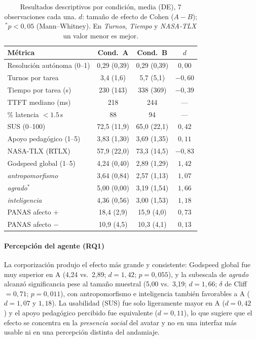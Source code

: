 \documentclass[conference]{IEEEtran}
\begin{document}
\begin{table}[t]
  \caption{Resultados descriptivos por condici\'on, media (DE), 7 observaciones cada una.
  $d$: tama\~no de efecto de Cohen ($A-B$); ${}^{*}p<0{,}05$ (Mann--Whitney). En \emph{Turnos},
  \emph{Tiempo} y \emph{NASA-TLX} un valor menor es mejor.}
  \label{tab:results}
  \centering
  \footnotesize
  \begin{tabular}{@{}lccc@{}}
    \toprule
    \textbf{M\'etrica} & \textbf{Cond.\ A} & \textbf{Cond.\ B} & \textbf{$d$} \\
    \midrule
    Resoluci\'on aut\'onoma (0--1) & 0{,}29 (0{,}39) & 0{,}29 (0{,}39) & $0{,}00$ \\
    Turnos por tarea & 3{,}4 (1{,}6) & 5{,}7 (5{,}1) & $-0{,}60$ \\
    Tiempo por tarea (s) & 230 (143) & 338 (369) & $-0{,}39$ \\
    TTFT mediano (ms) & 218 & 244 & --- \\
    \% latencia $<1.5$\,s & 88 & 94 & --- \\
    SUS (0--100) & 72{,}5 (11{,}9) & 65{,}0 (22{,}1) & $0{,}42$ \\
    Apoyo pedag\'ogico (1--5) & 3{,}83 (1{,}30) & 3{,}69 (1{,}35) & $0{,}11$ \\
    NASA-TLX (RTLX) & 57{,}9 (22{,}0) & 73{,}3 (14{,}5) & $-0{,}83$ \\
    Godspeed global (1--5) & 4{,}24 (0{,}40) & 2{,}89 (1{,}29) & $1{,}42$ \\
    \quad\emph{antropomorfismo} & 3{,}64 (0{,}84) & 2{,}57 (1{,}13) & $1{,}07$ \\
    \quad\emph{agrado}${}^{*}$ & 5{,}00 (0{,}00) & 3{,}19 (1{,}54) & $1{,}66$ \\
    \quad\emph{inteligencia} & 4{,}36 (0{,}56) & 3{,}00 (1{,}53) & $1{,}18$ \\
    PANAS afecto $+$ & 18{,}4 (2{,}9) & 15{,}9 (4{,}0) & $0{,}73$ \\
    PANAS afecto $-$ & 10{,}9 (4{,}5) & 10{,}3 (4{,}1) & $0{,}13$ \\
    \bottomrule
  \end{tabular}
\end{table}

\paragraph{Percepci\'on del agente (RQ1)} La corporizaci\'on produjo el efecto m\'as grande y
consistente: Godspeed global fue muy superior en A (4{,}24 vs.\ 2{,}89; $d=1{,}42$; $p=0{,}055$),
y la subescala de \emph{agrado} alcanz\'o significancia pese al tama\~no muestral (5{,}00 vs.\
3{,}19; $d=1{,}66$; $\delta$ de Cliff${}=0{,}71$; $p=0{,}011$), con antropomorfismo e inteligencia
tambi\'en favorables a A ($d=1{,}07$ y $1{,}18$). La usabilidad (SUS) fue solo ligeramente mayor en
A ($d=0{,}42$) y el apoyo pedag\'ogico percibido fue equivalente ($d=0{,}11$), lo que sugiere que el
efecto se concentra en la \emph{presencia social} del avatar y no en una interfaz m\'as usable ni en
una percepci\'on distinta del andamiaje.
\end{document}
